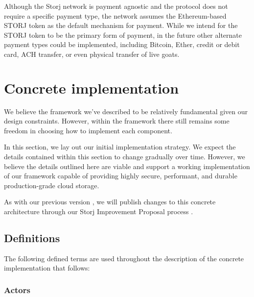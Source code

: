 \documentclass[8pt,fleqn,openany]{book}
\begin{document}
Although the Storj network is payment agnostic and
the protocol does not require a specific payment type,
the network assumes the Ethereum-based STORJ token as the default mechanism
for payment. While we intend for the STORJ token to be the primary form of payment, in the future other alternate payment types could be implemented, including Bitcoin,
Ether, credit or debit card, ACH transfer, or even physical transfer of
live goats.

\chapter{Concrete implementation}\label{chap:concrete}

We believe the framework we've described to be relatively fundamental
given our design constraints. However, within the framework there still remains
some freedom in choosing how to implement each component.

In this section, we lay out our initial implementation strategy. We expect
the details contained within this section to change gradually over time.
However, we believe the details outlined here are viable and support a working
implementation of our framework capable of providing highly secure, performant,
and durable production-grade cloud storage.

As with our previous version \cite{storj-v2}, we will publish changes to this
concrete architecture through our Storj Improvement Proposal process \cite{sips}.

\section{Definitions}

The following defined terms are used throughout the description of the concrete
implementation that follows:

\subsection{Actors}
\end{document}

